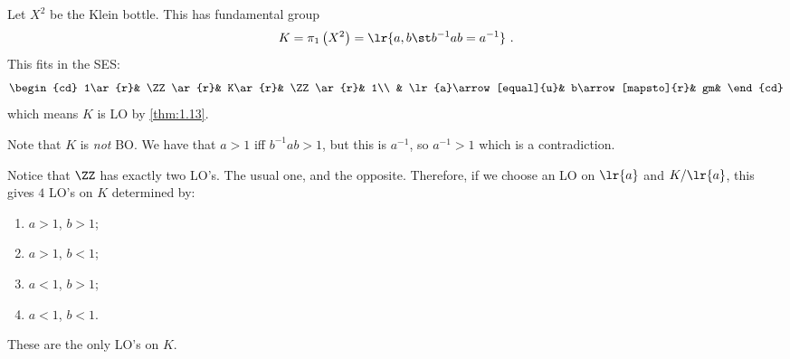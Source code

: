\begin{exm}
Let $X^2$ be the Klein bottle.
This has fundamental group
\begin{equation}
K = \pi_1\left(X^2\right) = \lr{a,b \st b^{-1} a b = a^{-1}}
\ . 
\end{equation}
This fits in the SES:
\begin{equation}
\begin{cd}
1\ar{r}&
\ZZ\ar{r}&
K\ar{r}&
\ZZ\ar{r}&
1\\
& \lr{a}\arrow[equal]{u}&
b\arrow[mapsto]{r}&
gm&
\end{cd}
\end{equation}
which means $K$ is LO by \cref{thm:1.13}.

Note that $K$ is \emph{not} BO. We have that $a > 1$ iff $b^{-1} a b > 1$, but this is
$a^{-1}$, so $a^{-1} > 1$ which is a contradiction.

Notice that $\ZZ$ has exactly two LO's. The usual one, and the opposite.
Therefore, if we choose an LO on $\lr{a}$ and $K / \lr{a}$, this gives $4$ LO's on $K$
determined by:
\begin{enumerate}[label = (\iii)]
\item $a> 1$, $b > 1$;
\item $a> 1$, $b < 1$;
\item $a< 1$, $b > 1$;
\item $a< 1$, $b < 1$.
\end{enumerate}
\end{exm}

\begin{thm}
These are the only LO's on $K$.
\label{thm:1.14}
\end{thm}

